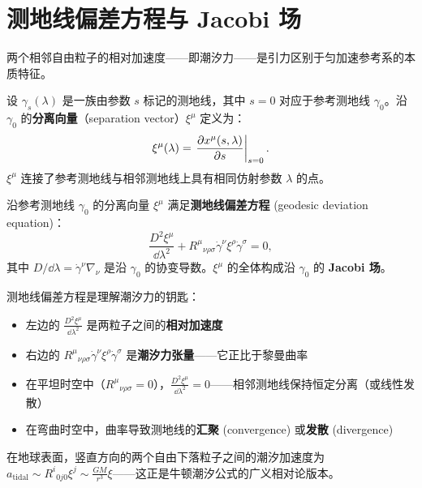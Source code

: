 \section{测地线偏差方程与 Jacobi 场}

两个相邻自由粒子的相对加速度——即潮汐力——是引力区别于匀加速参考系的本质特征。

\begin{definition}[Jacobi 场]
设 $\gamma_s(\lambda)$ 是一族由参数 $s$ 标记的测地线，其中 $s=0$ 对应于参考测地线 $\gamma_0$。沿 $\gamma_0$ 的\textbf{分离向量}（separation vector）$\xi^\mu$ 定义为：
\begin{equation}
    \xi^\mu(\lambda) = \left. \frac{\partial x^\mu(s, \lambda)}{\partial s} \right|_{s=0}.
\end{equation}
$\xi^\mu$ 连接了参考测地线与相邻测地线上具有相同仿射参数 $\lambda$ 的点。
\end{definition}

\begin{theorem}
沿参考测地线 $\gamma_0$ 的分离向量 $\xi^\mu$ 满足\textbf{测地线偏差方程} (geodesic deviation equation)：
\begin{equation}
    \boxed{\frac{D^2 \xi^\mu}{\dd\lambda^2} + R^\mu{}_{\nu\rho\sigma} \dot\gamma^\nu \xi^\rho \dot\gamma^\sigma = 0},
\end{equation}
其中 $D/\dd\lambda = \dot\gamma^\nu \nabla_\nu$ 是沿 $\gamma_0$ 的协变导数。$\xi^\mu$ 的全体构成沿 $\gamma_0$ 的 \textbf{Jacobi 场}。
\end{theorem}

\begin{note}
测地线偏差方程是理解潮汐力的钥匙：
\begin{itemize}
    \item 左边的 $\frac{D^2 \xi^\mu}{\dd\lambda^2}$ 是两粒子之间的\textbf{相对加速度}
    \item 右边的 $R^\mu{}_{\nu\rho\sigma} \dot\gamma^\nu \xi^\rho \dot\gamma^\sigma$ 是\textbf{潮汐力张量}——它正比于黎曼曲率
    \item 在平坦时空中（$R^\mu{}_{\nu\rho\sigma} = 0$），$\frac{D^2 \xi^\mu}{\dd\lambda^2} = 0$——相邻测地线保持恒定分离（或线性发散）
    \item 在弯曲时空中，曲率导致测地线的\textbf{汇聚} (convergence) 或\textbf{发散} (divergence)
\end{itemize}
在地球表面，竖直方向的两个自由下落粒子之间的潮汐加速度为 $a_{\text{tidal}} \sim R^i{}_{0j0} \xi^j \sim \frac{GM}{r^3} \xi$——这正是牛顿潮汐公式的广义相对论版本。
\end{note}


